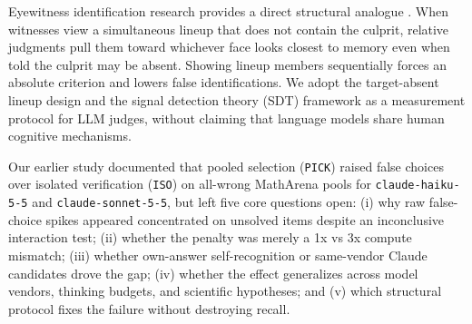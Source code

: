 \documentclass[10pt,twocolumn]{article}
\begin{document}
Eyewitness identification research provides a direct structural analogue \citep{wells1984psychology,malpass1981eyewitness,steblay2001eyewitness,steblay2011seventytwo}. When witnesses view a simultaneous lineup that does not contain the culprit, relative judgments pull them toward whichever face looks closest to memory even when told the culprit may be absent. Showing lineup members sequentially forces an absolute criterion and lowers false identifications. We adopt the target-absent lineup design and the signal detection theory (SDT) framework \citep{wixted2012field} as a measurement protocol for LLM judges, without claiming that language models share human cognitive mechanisms.

Our earlier study \citep[v1;][]{sharma2026nocandidate} documented that pooled selection (\texttt{PICK}) raised false choices over isolated verification (\texttt{ISO}) on all-wrong MathArena \citep{balunovic2025matharena} pools for \texttt{claude-haiku-5-5} and \texttt{claude-sonnet-5-5}, but left five core questions open: (i) why raw false-choice spikes appeared concentrated on unsolved items despite an inconclusive interaction test; (ii) whether the penalty was merely a 1x vs 3x compute mismatch; (iii) whether own-answer self-recognition or same-vendor Claude candidates drove the gap; (iv) whether the effect generalizes across model vendors, thinking budgets, and scientific hypotheses; and (v) which structural protocol fixes the failure without destroying recall.
\end{document}
